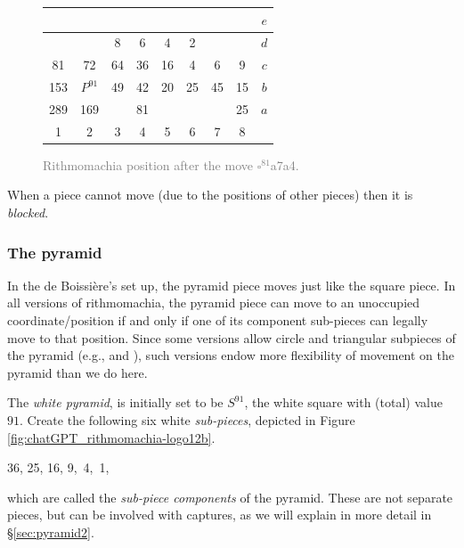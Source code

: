 \documentclass[12pt]{article}
\begin{document}
\begin{figure}[h!]
\begin{tabular}{|c|c|c|c|c|c|c|c||c}
\quad  & \quad  & \quad  & \quad  & \quad  & \quad  & \quad  & \quad  & $e$ \\ \hline
\quad  & \quad  & \circlet{\,}8 & \circlet{\,}6 & \circlet{\,}4 & \circlet{\,}2 & \quad  & \quad  & $d$ \\ \hline
\trianglepa{\,}81 & \trianglepa{\,}72 & \circlet{\,}64 & \circlet{\,}36 & \circlet{\,}16 & \circlet{\,}4 & \trianglepa{\,}6 & \trianglepa{\,}9 & $c$ \\ \hline
\squad{\,}153 & \rhombus{\,}$P^{91}$ & \trianglepa{\,}49 & \trianglepa{\,}42 & \trianglepa{\,}20 & \trianglepa{\,}25 & \squad{\,}45 & \squad{\,}15 & $b$ \\ \hline
\squad{\,}289 & \squad{\,}169 & \quad  & \squad{\,}81 & \quad  & \quad  & \quad  & \squad{\,}25 & $a$ \\ \hline
1 &  2 &  3 &  4 &  5 &  6 &  7 &  8  &  \\
\end{tabular} 
\caption{\textcolor{gray}{Rithmomachia position after the move $\square^{81}$a7a4.}}
\label{fig:rithmomachia-after-S81-60-30-with-pyramid2} 
\end{figure}

When a piece cannot move (due to the positions of other pieces)
then it is {\it blocked}.
        
\subsubsection{The pyramid}
\label{sec:pyramid1}

In the de Boissi\`ere's set up, the pyramid piece moves just like the square piece.
In all versions of rithmomachia,
the pyramid piece can move to an unoccupied coordinate/position
if and only if one of its component sub-pieces can legally move
to that position.
Since some versions allow circle and triangular
subpieces of the pyramid (e.g., \cite{Ne98} and \cite{DG21}),
such versions endow more flexibility
of movement on the pyramid than we do here.

The {\it white pyramid}, is initially set to be $S^{91}$,
the white square with (total) value $91$. 
Create the following six white {\it sub-pieces}, depicted in
Figure \ref{fig:chatGPT_rithmomachia-logo12b}.

\begin{center}
{\squad}36, {\squad}25, {\squad}16,
{\squad}9, {\squad\,}4, {\squad\,}1,
\end{center}
which are called the {\it sub-piece components} of the pyramid.
These are not separate pieces, but can be involved with
captures, as we will explain in more detail in \S \ref{sec:pyramid2}.
\end{document}

